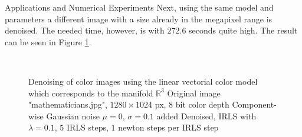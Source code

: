 \begin{chapter}{Applications and Numerical Experiments}
Next, using the same model and parameters a different image with a size already in the megapixel range is denoised. The needed
time, however, is with $272.6$ seconds quite high. The result can be seen in Figure \ref{fig:application_color2}.\\

\begin{figure}[h!]
    \centering
    \\
    \caption[Large image "mathematicians" linear-vectorial denoising]{Denoising of color images using the linear vectorial color model which corresponds to the manifold $\mathbb{R}^3$
	 Original image "mathematicians.jpg", $1280\times 1024$ px, 8 bit color depth
	 Component-wise Gaussian noise $\mu=0$, $\sigma=0.1$ added
	 Denoised, IRLS with $\lambda=0.1$, $5$ IRLS steps, $1$ newton steps per IRLS step
	\label{fig:application_color2}
    }
\end{figure}


\end{chapter}
